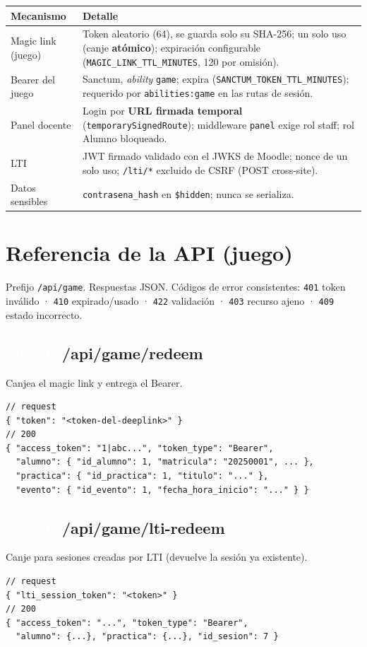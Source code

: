 \documentclass[11pt,letterpaper]{article}
\newcommand{\http}[1]{\colorbox{azultec}{\textcolor{white}{\ttfamily\small\,#1\,}}}
\begin{document}
\begin{longtable}{p{4.4cm} p{10.6cm}}
\toprule \textbf{Mecanismo} & \textbf{Detalle} \\ \midrule
\endhead
Magic link (juego) & Token aleatorio (64), se guarda solo su SHA-256; un solo uso (canje \textbf{atómico}); expiración configurable (\texttt{MAGIC\_LINK\_TTL\_MINUTES}, 120 por omisión). \\
Bearer del juego & Sanctum, \emph{ability} \texttt{game}; expira (\texttt{SANCTUM\_TOKEN\_TTL\_MINUTES}); requerido por \texttt{abilities:game} en las rutas de sesión. \\
Panel docente & Login por \textbf{URL firmada temporal} (\texttt{temporarySignedRoute}); middleware \texttt{panel} exige rol staff; rol Alumno bloqueado. \\
LTI & JWT firmado validado con el JWKS de Moodle; nonce de un solo uso; \texttt{/lti/*} excluido de CSRF (POST cross-site). \\
Datos sensibles & \texttt{contrasena\_hash} en \texttt{\$hidden}; nunca se serializa. \\
\bottomrule
\end{longtable}

\section{Referencia de la API (juego)}
Prefijo \texttt{/api/game}. Respuestas JSON. Códigos de error consistentes:
\texttt{401} token inválido · \texttt{410} expirado/usado · \texttt{422} validación
· \texttt{403} recurso ajeno · \texttt{409} estado incorrecto.

\subsection{\http{POST} /api/game/redeem}
Canjea el magic link y entrega el Bearer.
\begin{lstlisting}
// request
{ "token": "<token-del-deeplink>" }
// 200
{ "access_token": "1|abc...", "token_type": "Bearer",
  "alumno": { "id_alumno": 1, "matricula": "20250001", ... },
  "practica": { "id_practica": 1, "titulo": "..." },
  "evento": { "id_evento": 1, "fecha_hora_inicio": "..." } }
\end{lstlisting}

\subsection{\http{POST} /api/game/lti-redeem}
Canje para sesiones creadas por LTI (devuelve la sesión ya existente).
\begin{lstlisting}
// request
{ "lti_session_token": "<token>" }
// 200
{ "access_token": "...", "token_type": "Bearer",
  "alumno": {...}, "practica": {...}, "id_sesion": 7 }
\end{lstlisting}
\end{document}
